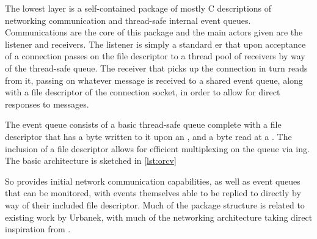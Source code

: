 The lowest layer is a self-contained package of mostly C descriptions of networking communication and thread-safe internal event queues.
Communications are the core of this package and the main actors given are the listener and receivers.
The listener is simply a standard er that upon acceptance of a connection passes on the file descriptor to a thread pool of receivers by way of the thread-safe queue.
The receiver that picks up the connection in turn reads from it, passing on whatever message is received to a shared event queue, along with a file descriptor of the connection socket, in order to allow for direct responses to messages.

The event queue consists of a basic thread-safe queue complete with a file descriptor that has a byte written to it upon an , and a byte read at a .
The inclusion of a file descriptor allows for efficient multiplexing on the queue via ing.
The basic architecture is sketched in \cref{lst:orcv}

So \orcv{} provides initial network communication capabilities, as well as event queues that can be monitored, with events themselves able to be replied to directly by way of their included file descriptor.
Much of the package structure is related to existing work by Urbanek, with much of the networking architecture taking direct inspiration from \textcite{stevens1997network}.
